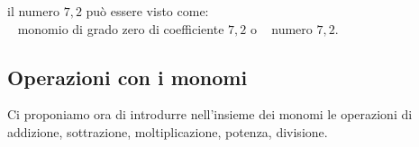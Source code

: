 \begin{esempio}{}{}
il numero \(7,2\) può essere visto come:\\ 
~ monomio di grado zero di coefficiente \(7,2\) 
\quad o \quad 
{}~ numero \(7,2\).
\end{esempio}


\begin{comment}


\subsection{Valore di un monomio}
\label{subsec:monomi_valore}

Poiché il monomio è un'espressione letterale,
possiamo calcolarne il valore quando alle sue variabili sostituiamo 
numeri.

\begin{esempio}{}{}
 Calcola il valore del monomio~\(3x^{4}y^{5}z\) per i valori~\(x=-3\), 
\(y=5\) 
e~\(z=0\).

Sostituendo i valori assegnati 
otteniamo~\(3\cdot (-3)^{4}\cdot 5^{5}\cdot 0=0\) 
essendo uno dei fattori nullo.
\end{esempio}


\begin{osservazione}{}{} 
Il valore di un monomio è nullo quando almeno una 
delle sue 
variabili assume il valore~0.
\end{osservazione}


Molte formule di geometria sono scritte sotto forma di monomi: area del
triangolo~\(\frac{1}{2}bh\) area del quadrato~\(l^{2}\)
perimetro del quadrato~\(4l\) area del rettangolo~\(bh\) volume del 
cubo~\(l^{3}\) ecc.
Esse acquistano significato quando alle lettere sostituiamo
numeri che rappresentano le misure della figura considerata.


\end{comment}


\subsection{Operazioni con i monomi}
\label{subsec:monomi_operazioni}

Ci proponiamo ora di introdurre nell'insieme dei monomi
le operazioni di addizione, sottrazione, moltiplicazione, potenza,
divisione.

